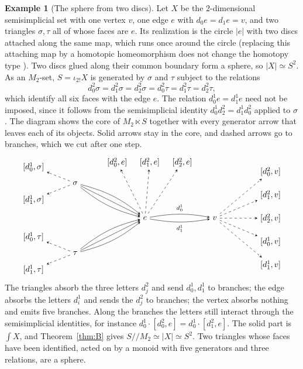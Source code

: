 \documentclass[11pt]{amsart}
\theoremstyle{definition}
\newtheorem{example}[teo]{Example}
\theoremstyle{remark}
\numberwithin{figure}{section}%
\begin{document}
\begin{example}[The sphere from two discs]
\label{ex:sphere}
Let $X$ be the $2$-dimensional semisimplicial set with one vertex $v$, one edge $e$ with $d_0e=d_1e=v$, and two triangles $\sigma,\tau$ all of whose faces are $e$. Its realization is the circle $|e|$ with two discs attached along the same map, which runs once around the circle (replacing this attaching map by a homotopic homeomorphism does not change the homotopy type \cite[Prop.~0.18]{Hatcher}). Two discs glued along their common boundary form a sphere, so $|X|\simeq S^2$. As an $M_2$-set, $S=\iota_{2!}X$ is generated by $\sigma$ and $\tau$ subject to the relations
\[
d^2_0\sigma=d^2_1\sigma=d^2_2\sigma=d^2_0\tau=d^2_1\tau=d^2_2\tau,
\]
which identify all six faces with the edge $e$. The relation $d^1_0e=d^1_1e$ need not be imposed, since it follows from the semisimplicial identity $d^1_0d^2_2=d^1_1d^2_0$ applied to $\sigma$.
The diagram shows the core of $M_2\ltimes S$ together with every generator arrow that leaves each of its objects. Solid arrows stay in the core, and dashed arrows go to branches, which we cut after one step.
\[
\begin{tikzpicture}[x=1cm,y=1cm,>=stealth,baseline=(e.base)]
\node (s) at (0,1.5) {$\sigma$};
\node (t) at (0,-1.5) {$\tau$};
\node (e) at (3,0) {$e$};
\node (v) at (6,0) {$v$};
\node (s0) at (-1.8,2.2) {$[d^1_0,\sigma]$};
\node (s1) at (-1.8,0.8) {$[d^1_1,\sigma]$};
\node (t0) at (-1.8,-0.8) {$[d^1_0,\tau]$};
\node (t1) at (-1.8,-2.2) {$[d^1_1,\tau]$};
\node (e0) at (1.8,2.4) {$[d^2_0,e]$};
\node (e1) at (3.2,2.4) {$[d^2_1,e]$};
\node (e2) at (4.6,2.4) {$[d^2_2,e]$};
\node (v0) at (8.4,2) {$[d^2_0,v]$};
\node (v1) at (8.4,1) {$[d^2_1,v]$};
\node (v2) at (8.4,0) {$[d^2_2,v]$};
\node (v3) at (8.4,-1) {$[d^1_0,v]$};
\node (v4) at (8.4,-2) {$[d^1_1,v]$};
\draw[->] (s) to[bend left=12] (e);
\draw[->] (s) -- (e);
\draw[->] (s) to[bend right=12] (e);
\draw[->] (t) to[bend left=12] (e);
\draw[->] (t) -- (e);
\draw[->] (t) to[bend right=12] (e);
\draw[->] (e) to[bend left=10] node[above]{\scriptsize$d^1_0$} (v);
\draw[->] (e) to[bend right=10] node[below]{\scriptsize$d^1_1$} (v);
\foreach \a/\b in {s/s0,s/s1,t/t0,t/t1,e/e0,e/e1,e/e2,v/v0,v/v1,v/v2,v/v3,v/v4}
  \draw[->,dashed] (\a) -- (\b);
\end{tikzpicture}
\]
The triangles absorb the three letters $d^2_j$ and send $d^1_0,d^1_1$ to branches; the edge absorbs the letters $d^1_i$ and sends the $d^2_j$ to branches; the vertex absorbs nothing and emits five branches. Along the branches the letters still interact through the semisimplicial identities, for instance $d^1_0\cdot[d^2_0,e]=d^1_0\cdot[d^2_1,e]$. The solid part is $\int X$, and Theorem~\ref{thm:B} gives $S/\!/M_2\simeq|X|\simeq S^2$. Two triangles whose faces have been identified, acted on by a monoid with five generators and three relations, are a sphere.
\end{example}
\end{document}
